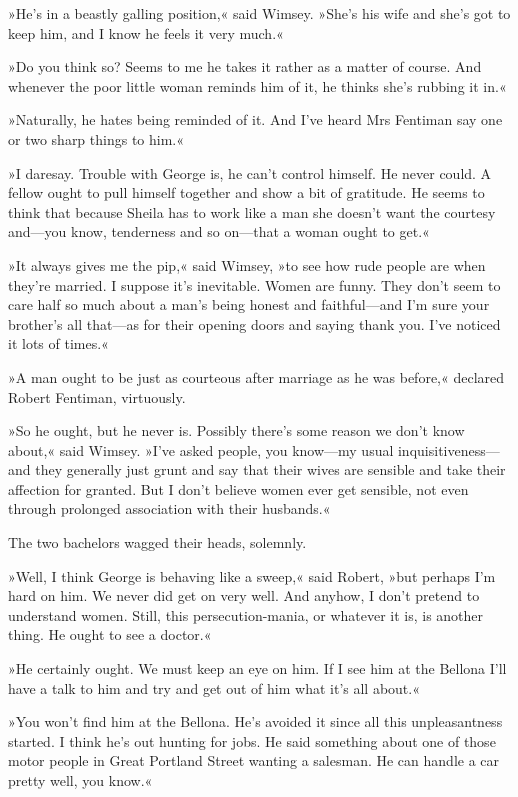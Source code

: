 »He's in a beastly galling position,« said Wimsey. »She's his wife and she's got to keep him, and I know he feels it very much.«

»Do you think so? Seems to me he takes it rather as a matter of course. And whenever the poor little woman reminds him of it, he thinks she's rubbing it in.«

»Naturally, he hates being reminded of it. And I've heard Mrs Fentiman say one or two sharp things to him.«

»I daresay. Trouble with George is, he can't control himself. He never could. A fellow ought to pull himself together and show a bit of gratitude. He seems to think that because Sheila has to work like a man she doesn't want the courtesy and\allowbreak---\allowbreak you know, tenderness and so on\allowbreak---\allowbreak that a woman ought to get.«

»It always gives me the pip,« said Wimsey, »to see how rude people are when they're married. I suppose it's inevitable. Women are funny. They don't seem to care half so much about a man's being honest and faithful\allowbreak---\allowbreak and I'm sure your brother's all that\allowbreak---\allowbreak as for their opening doors and saying thank you. I've noticed it lots of times.«

»A man ought to be just as courteous after marriage as he was before,« declared Robert Fentiman, virtuously.

»So he ought, but he never is. Possibly there's some reason we don't know about,« said Wimsey. »I've asked people, you know\allowbreak---\allowbreak my usual inquisitiveness\allowbreak---\allowbreak and they generally just grunt and say that their wives are sensible and take their affection for granted. But I don't believe women ever get sensible, not even through prolonged association with their husbands.«

The two bachelors wagged their heads, solemnly.

»Well, I think George is behaving like a sweep,« said Robert, »but perhaps I'm hard on him. We never did get on very well. And anyhow, I don't pretend to understand women. Still, this persecution-mania, or whatever it is, is another thing. He ought to see a doctor.«

»He certainly ought. We must keep an eye on him. If I see him at the Bellona I'll have a talk to him and try and get out of him what it's all about.«

»You won't find him at the Bellona. He's avoided it since all this unpleasantness started. I think he's out hunting for jobs. He said something about one of those motor people in Great Portland Street wanting a salesman. He can handle a car pretty well, you know.«

